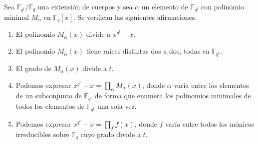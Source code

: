 \begin{theorem}
  \label{th:prop-pol-minimal}
  Sea \(\mathbb F_{q^t}/\mathbb F_q\) una extensión de cuerpos y sea \(\alpha\) un elemento de \(\mathbb F_{q^t}\) con polinomio minimal \(M_{\alpha}\) en \(\mathbb F_q[x]\).
  Se verifican las siguientes afirmaciones.
  \begin{enumerate}
    \item El polinomio \(M_{\alpha}(x)\) divide a \(x^{q^t} - x\).
    \label{thi:prop-pol-minimal-div}
    \item El polinomio \(M_{\alpha}(x)\) tiene raíces distintas dos a dos, todas en \(\mathbb F_{q^t}\).
    \item El grado de \(M_{\alpha}(x)\) divide a \(t\).
    \item Podemos expresar \(x^{q^t}- x = \prod_{\alpha}M_{\alpha}(x)\), donde \(\alpha\) varía entre los elementos de un subconjunto de \(\mathbb F_{q^t}\) de forma que enumera los polinomios minimales de todos los elementos de \(\mathbb F_{q^t}\) una sola vez.
    \item Podemos expresar \(x^{q^t}- x = \prod_{f}f(x)\), donde \(f\) varía entre todos los mónicos irreducibles sobre \(\mathbb F_q\) cuyo grado divide a \(t\).
  \end{enumerate}
\end{theorem}


